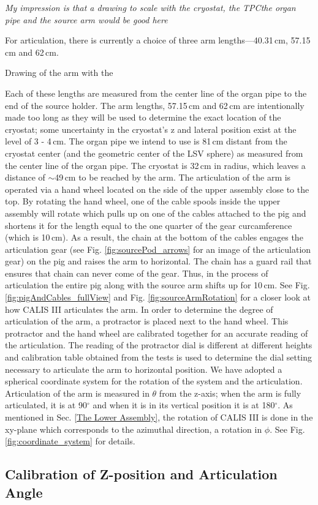 \textit{My impression is that a drawing to scale with the cryostat, the TPCthe organ pipe and the source arm would be good here}

For articulation, there is currently a choice of three arm lengths---40.31\,cm,  57.15\,cm and 62\,cm.  

Drawing of the arm with the 


Each of these lengths are measured from the center line of the organ pipe to the end of the source holder.  The arm lengths, 57.15\,cm and 62\,cm are intentionally made too long as they will be used to determine the exact location of the cryostat; some uncertainty in the cryostat's z and lateral position exist at the level of 3 - 4\,cm. The organ pipe we intend to use is 81\,cm distant from the cryostat center (and the geometric center of the LSV sphere) as measured from the center line of the organ pipe. The cryostat is 32\,cm in radius, which leaves a distance of $\sim$49\,cm to be reached  by the arm.  The articulation of the arm is operated via a hand wheel located on the side of the upper assembly close to the top.  By rotating the hand wheel, one of the cable spools inside the upper assembly will rotate which pulls up on one of the cables attached to the pig and shortens it for the length equal to the one quarter of the gear curcamference (which is 10\,cm).  As a result, the chain at the bottom of the cables engages the articulation gear (see Fig. \ref{fig:sourcePod_arrows} for an image of the articulation gear) on the pig and raises the arm to horizontal.  The chain has a guard rail that ensures that chain can never come of the gear. Thus, in the process of articulation the entire pig along with the source arm shifts up for 10\,cm.  See Fig. \ref{fig:pigAndCables_fullView} and  Fig. \ref{fig:sourceArmRotation} for a closer look at how CALIS III articulates the arm. In order to determine the degree of articulation of the arm, a protractor is placed next to the hand wheel.  This protractor and the hand wheel are calibrated together for an accurate reading of the articulation. The reading of the protractor dial is different at different heights and calibration table obtained from the tests is used to determine the dial setting necessary to articulate the arm to horizontal position. We have adopted a spherical coordinate system for the rotation of the system and the articulation.  Articulation of the arm is measured in $\theta$ from the z-axis; when the arm is fully articulated, it is at 90$^{\circ}$ and when it is in its vertical position it is at 180$^{\circ}$.  As mentioned in Sec. \ref{The Lower Assembly}, the rotation of CALIS III is done in the xy-plane which corresponds to the azimuthal direction, a rotation in $\phi$.  See Fig. \ref{fig:coordinate_system} for details. 


\subsection{Calibration of Z-position and Articulation Angle}  